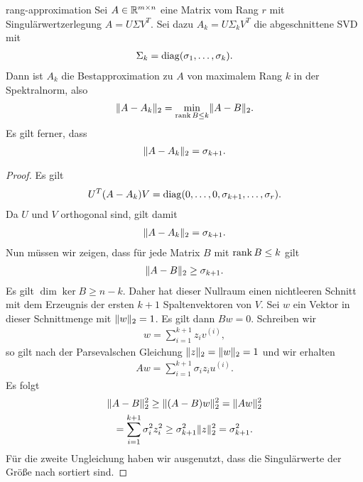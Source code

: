 \begin{Satz}{rang-approximation}
  Sei $A\in \mathbb R^{m\times n}$ eine Matrix vom Rang $r$ mit
  Singulärwertzerlegung $A = U\Sigma V^T$. Sei dazu
  $A_k = U\Sigma_k V^T$ die abgeschnittene SVD mit
  \begin{gather}
    \Sigma_k = \operatorname{diag}(\sigma_1,\dots,\sigma_k).
  \end{gather}
  Dann ist $A_k$ die Bestapproximation zu $A$ von maximalem Rang $k$ in der
  Spektralnorm, also
  \begin{gather}
    \lVert A-A_k\rVert_2 = \min_{\operatorname{rank} B\le k} \lVert A-B\rVert_2.
  \end{gather}
  Es gilt ferner, dass
  \begin{gather}
    \lVert A-A_k\rVert_2 = \sigma_{k+1}.
  \end{gather}
\end{Satz}

\begin{proof}
  Es gilt
  \begin{gather}
    U^T (A-A_k) V = \operatorname{diag}(0,\dots,0,\sigma_{k+1},\dots,\sigma_r).
  \end{gather}
  Da $U$ und $V$ orthogonal sind, gilt damit
  \begin{gather}
    \lVert A-A_k\rVert_2 = \sigma_{k+1}.
  \end{gather}
  Nun müssen wir zeigen, dass für jede Matrix $B$ mit $\operatorname{rank} B\le k$ gilt
  \begin{gather}
    \lVert A-B\rVert_2 \ge \sigma_{k+1}.
  \end{gather}
  Es gilt $\dim \ker B \ge n-k$. Daher hat dieser Nullraum einen
  nichtleeren Schnitt mit dem Erzeugnis der ersten $k+1$
  Spaltenvektoren von $V$. Sei $w$ ein Vektor in dieser Schnittmenge
  mit $\lVert w\rVert_2=1$. Es gilt dann $Bw=0$. Schreiben wir
  \begin{gather}
    w = \sum_{i=1}^{k+1} z_i v^{(i)},
  \end{gather}
  so gilt nach der Parsevalschen Gleichung
  $\lVert z\rVert_2 = \lVert w\rVert_2 = 1$ und wir erhalten
  \begin{gather}
    Aw = \sum_{i=1}^{k+1} \sigma_i z_i u^{(i)}.
  \end{gather}
  Es folgt
  \begin{multline}
    \lVert A-B\rVert_2^2
    \ge \lVert(A-B)w\rVert_2^2
    = \lVert Aw\rVert_2^2 \\
    = \sum_{i=1}^{k+1} \sigma_i^2 z_i^2
    \ge \sigma_{k+1}^2 \lVert z\rVert_2^2 = \sigma_{k+1}^2.
  \end{multline}
  Für die zweite Ungleichung haben wir ausgenutzt, dass die
  Singulärwerte der Größe nach sortiert sind.
\end{proof}

